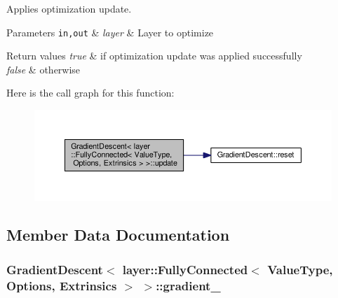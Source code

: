 Applies optimization update. 


\begin{DoxyParams}[1]{Parameters}
\mbox{\tt in,out}  & {\em layer} & Layer to optimize \\
\hline
\end{DoxyParams}

\begin{DoxyRetVals}{Return values}
{\em true} & if optimization update was applied successfully \\
\hline
{\em false} & otherwise \\
\hline
\end{DoxyRetVals}


Here is the call graph for this function\-:
\nopagebreak
\begin{figure}[H]
\begin{center}
\leavevmode
\includegraphics[width=350pt]{class_gradient_descent_3_01layer_1_1_fully_connected_3_01_value_type_00_01_options_00_01_extrinsics_01_4_01_4_a9d52ce6af8abdb9a4bd35fd3a7784ef1_cgraph}
\end{center}
\end{figure}




\subsection{Member Data Documentation}
\hypertarget{class_gradient_descent_3_01layer_1_1_fully_connected_3_01_value_type_00_01_options_00_01_extrinsics_01_4_01_4_a80335475cd01026083a3206769791a37}{
\subsubsection[{gradient\-\_\-}]{ {\bf Gradient\-Descent}$<$ layer\-::\-Fully\-Connected$<$ Value\-Type, Options, Extrinsics $>$ $>$\-::gradient\-\_\-\hspace{0.3cm}{\ttfamily [protected]}}}\label{class_gradient_descent_3_01layer_1_1_fully_connected_3_01_value_type_00_01_options_00_01_extrinsics_01_4_01_4_a80335475cd01026083a3206769791a37}


